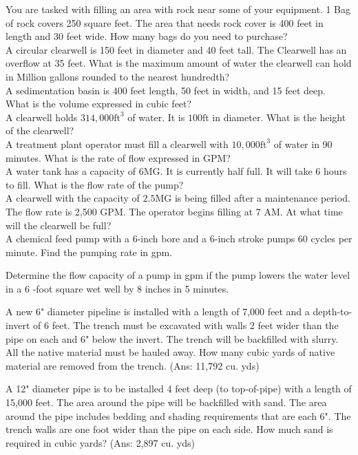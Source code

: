  You are tasked with filling an area with rock near some of your equipment. 1 Bag of rock covers 250 square feet. The area that needs rock cover is 400 feet in length and 30 feet wide. How many bags do you need to purchase?\\

A circular clearwell is 150 feet in diameter and 40 feet tall. The Clearwell has an overflow at 35 feet. What is the maximum amount of water the clearwell can hold in Million gallons rounded to the nearest hundredth?\\


 A sedimentation basin is 400 feet length, 50 feet in width, and 15 feet deep. What is the volume expressed in cubic feet?\\


 A clearwell holds $314,000 \mathrm{ft}^{3}$ of water. It is $100 \mathrm{ft}$ in diameter. What is the height of the clearwell?\\

 A treatment plant operator must fill a clearwell with $10,000 \mathrm{ft}^{3}$ of water in 90 minutes. What is the rate of flow expressed in GPM?\\


 A water tank has a capacity of 6MG. It is currently half full. It will take 6 hours to fill. What is the flow rate of the pump?\\


 A clearwell with the capacity of $2.5 \mathrm{MG}$ is being filled after a maintenance period. The flow rate is 2,500 GPM. The operator begins filling at 7 AM. At what time will the clearwell be full?\\

  A chemical feed pump with a 6-inch bore and a 6-inch stroke pumps 60 cycles per minute. Find the pumping rate in gpm.
  
  Determine the flow capacity of a pump in gpm if the pump lowers the water level in a 6 -foot square wet well by 8 inches in 5 minutes.
  
  A new 6" diameter pipeline is installed with a length of 7,000 feet and a depth-to-invert of 6 feet. The trench must be excavated with walls 2 feet wider than the pipe on each and 6" below the invert.  The trench will be backfilled with slurry. All the native material must be hauled away. How many cubic yards of native material are removed from the trench.  (Ans: 11,792 cu. yds)
  
A 12" diameter pipe is to be installed 4 feet deep (to top-of-pipe) with a length of 15,000 feet. The area around the pipe will be backfilled with sand. The area around the pipe includes bedding and shading requirements that are each 6". The trench walls are one foot wider than the pipe on each side. How much sand is required in cubic yards? (Ans: 2,897 cu. yds)

